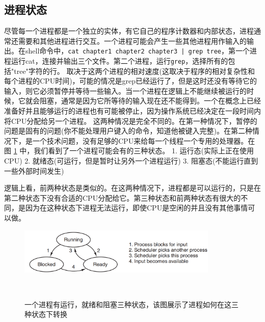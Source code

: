 	\subsection{进程状态}
	
	尽管每一个进程都是一个独立的实体，有它自己的程序计数器和内部状态，进程通常还需要和其他进程进行交互。一个进程可能会产生一些其他进程用作输入的输出。在shell命令中，\texttt{cat chapter1 chapter2 chapter3 | grep tree}，第一个进程运行cat，连接并输出三个文件。第二个进程，运行\texttt{grep}，选择所有的包括"tree"字符的行。
	取决于这两个进程的相对速度(这取决于程序的相对复杂性和每个进程的CPU时间)，可能的情况是grep已经运行了，但是这时还没有等待它的输入，则它必须暂停并等待一些输入。当一个进程在逻辑上不能继续被运行的时候，它就会阻塞，通常是因为它所等待的输入现在还不能得到。一个在概念上已经准备好并且能够运行的进程也有可能被停止，因为操作系统已经决定在一段时间内将CPU分配给另一个进程。
	这两种情况是完全不同的。在第一种情况下，暂停的问题是固有的问题(你不能处理用户键入的命令，知道他被键入完整)。在第二种情况下，是一个技术问题，没有足够的CPU来给每一个线程一个专用的处理器。在图 \ref{fig:processstatus} 中，我们看到了一个进程可能会有的三种状态。
	1. 运行态(实际上正在使用CPU)
	2. 就绪态(可运行，但是暂时让另外一个进程运行)
	3. 阻塞态(不能运行直到一些外部时间发生)
	
	逻辑上看，前两种状态是类似的。在这两种情况下，进程都是可以运行的，只是在第二种状态下没有合适的CPU分配给它。第三种状态和前两种状态有很大的不同，是因为在这种状态下进程无法运行，即使CPU是空闲的并且没有其他事情可以做。
	
	\begin{figure}[ht]\small
		\centering
		\includegraphics[width=0.85\textwidth]{FIG/2-2.png}
		\caption{一个进程有运行，就绪和阻塞三种状态，该图展示了进程如何在这三种状态下转换}　\label{fig:processstatus}
	\end{figure}

